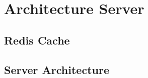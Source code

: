 \section{Architecture Server}

\subsection{Redis Cache}

\subsection{Server Architecture}

\newpage
